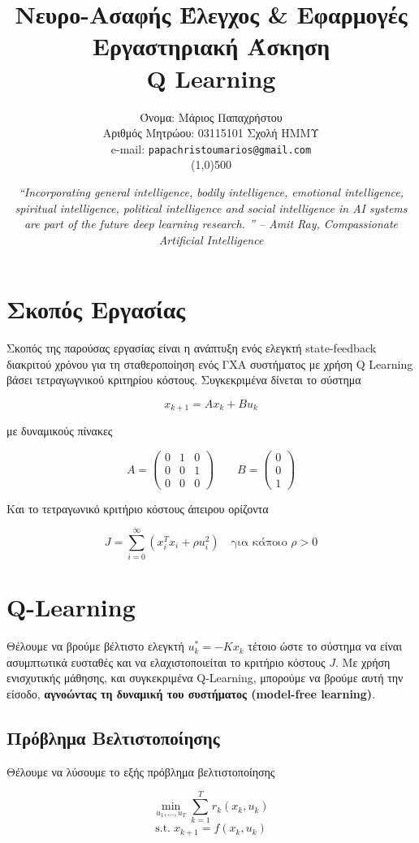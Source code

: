 \documentclass[a4paper,oneside,12pt]{article}
\title{ \textbf{Νευρο-Ασαφής Έλεγχος \& Εφαρμογές}  \\ Εργαστηριακή Άσκηση \\ Q Learning}
\author{Όνομα: Μάριος Παπαχρήστου \\ Αριθμός Μητρώου: 03115101 Σχολή ΗΜΜΥ \\ e-mail: \texttt{papachristoumarios@gmail.com}  \\ \line(1,0){500}}
\date{\emph{“Incorporating general intelligence, bodily intelligence, emotional intelligence, spiritual intelligence, political intelligence and social intelligence in AI systems are part of the future deep learning research. ” -- Amit Ray, Compassionate Artificial Intelligence}}
\begin{document}
\maketitle

\section{Σκοπός Εργασίας}

Σκοπός της παρούσας εργασίας είναι η ανάπτυξη ενός ελεγκτή state-feedback διακριτού χρόνου για τη σταθεροποίηση ενός ΓXA συστήματος με χρήση Q Learning βάσει τετραγωγνικού κριτηρίου κόστους. Συγκεκριμένα δίνεται το σύστημα 

$$x_{k+1} = A x_k + B u_k$$

με δυναμικούς πίνακες 

\begin{equation} \label{eq1}
A = \begin{pmatrix} 
	0 & 1 & 0 \\
	0 & 0 & 1 \\
	0 & 0 & 0
\end{pmatrix} \qquad
B = \begin{pmatrix}
	0 \\ 0 \\ 1 
\end{pmatrix}
\end{equation} 

Και το τετραγωνικό κριτήριο κόστους άπειρου ορίζοντα 

$$J = \sum_{i = 0}^\infty (x_i^T x_i + \rho u_i^2) \quad \text{για κάποιο } \rho > 0$$


\section{Q-Learning}

Θέλουμε να βρούμε βέλτιστο ελεγκτή $u^*_k = - K x_k$ τέτοιο ώστε το σύστημα να είναι ασυμπτωτικά ευσταθές και να ελαχιστοποιείται το κριτήριο κόστους $J$. Με χρήση ενισχυτικής μάθησης, και συγκεκριμένα Q-Learning, μπορούμε να βρούμε αυτή την είσοδο, \textbf{αγνοώντας τη δυναμική του συστήματος (model-free learning)}. 

\subsection{Πρόβλημα Βελτιστοποίησης}

Θέλουμε να λύσουμε το εξής πρόβλημα βελτιστοποίησης

$$\min_{u_1, \dots, u_T} \sum_{k = 1}^T r_k(x_k, u_k)$$
$$\mathrm{s.t.}\; x_{k+1} = f(x_k, u_k)$$
\end{document}
